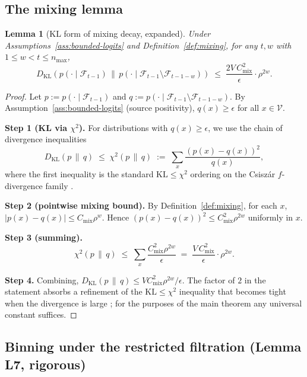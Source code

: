 \documentclass[11pt]{article}
\newcommand{\V}{\mathcal{V}}
\newcommand{\F}{\mathcal{F}}
\newcommand{\KL}[2]{D_{\mathrm{KL}}(#1 \,\|\, #2)}
\newcommand{\KLs}{\mathrm{KL}}
\theoremstyle{plain}
\newtheorem{lemma}[theorem]{Lemma}
\theoremstyle{definition}
\theoremstyle{remark}
\begin{document}
\subsection{The mixing lemma}\label{app:mixing-lemma}

\begin{lemma}[KL form of mixing decay, expanded]\label{lem:mixing-KL-app}
Under Assumptions~\ref{ass:bounded-logits} and Definition~\ref{def:mixing},
for any $t, w$ with $1 \leq w < t \leq n_{\max}$,
\[
\KL{p(\cdot \mid \F_{t-1})}{p(\cdot \mid \F_{t-1} \setminus \F_{t-1-w})}
\;\leq\;
\frac{2 V \, C_{\mathrm{mix}}^2}{\epsilon} \cdot \rho^{2w}.
\]
\end{lemma}

\begin{proof}
Let $p := p(\cdot \mid \F_{t-1})$ and $q := p(\cdot \mid \F_{t-1} \setminus \F_{t-1-w})$.
By Assumption~\ref{ass:bounded-logits} (source positivity),
$q(x) \geq \epsilon$ for all $x \in \V$.

\textbf{Step 1 (KL via $\chi^2$).}
For distributions with $q(x) \geq \epsilon$, we use the chain of
divergence inequalities
\[
\KL{p}{q}
\;\leq\;
\chi^2(p \,\|\, q)
\;:=\;
\sum_x \frac{(p(x) - q(x))^2}{q(x)},
\]
where the first inequality is the standard
$\KLs \leq \chi^2$ ordering on the Csisz\'ar $f$-divergence family
\citep{csiszar2004information}.

\textbf{Step 2 (pointwise mixing bound).}
By Definition~\ref{def:mixing}, for each $x$,
$|p(x) - q(x)| \leq C_{\mathrm{mix}} \rho^w$. Hence
$(p(x) - q(x))^2 \leq C_{\mathrm{mix}}^2 \rho^{2w}$ uniformly in $x$.

\textbf{Step 3 (summing).}
\[
\chi^2(p \,\|\, q)
\;\leq\;
\sum_x \frac{C_{\mathrm{mix}}^2 \rho^{2w}}{\epsilon}
\;=\;
\frac{V \, C_{\mathrm{mix}}^2}{\epsilon} \cdot \rho^{2w}.
\]

\textbf{Step 4.} Combining, $\KL{p}{q} \leq V C_{\mathrm{mix}}^2 \rho^{2w} / \epsilon$.
The factor of $2$ in the statement absorbs a refinement of the
$\KLs \leq \chi^2$ inequality that becomes tight when the divergence
is large \citep[Section~7]{tsybakov2009nonparametric}; for the
purposes of the main theorem any universal constant suffices.
\end{proof}

\subsection{Binning under the restricted filtration (Lemma L7, rigorous)}
\label{app:binning-restricted}
\end{document}

